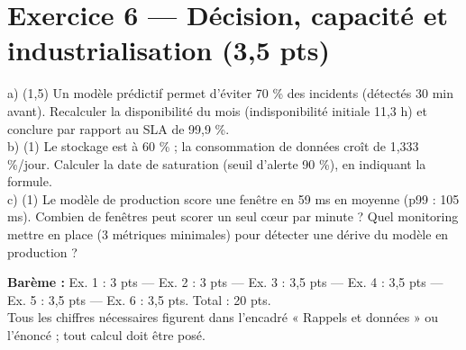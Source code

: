 \documentclass[11pt,a4paper]{article}
\begin{document}
\section*{Exercice 6 --- Décision, capacité et industrialisation (3,5 pts)}
a) (1,5) Un modèle prédictif permet d'éviter 70 \% des incidents (détectés 30 min avant).
Recalculer la disponibilité du mois (indisponibilité initiale 11,3 h) et conclure par
rapport au SLA de 99,9 \%.\\
b) (1) Le stockage est à 60 \% ; la consommation de données croît de 1,333 \%/jour.
Calculer la date de saturation (seuil d'alerte 90 \%), en indiquant la formule.\\
c) (1) Le modèle de production score une fenêtre en 59 ms en moyenne (p99 : 105 ms).
Combien de fenêtres peut scorer un seul cœur par minute ? Quel monitoring mettre en place
(3 métriques minimales) pour détecter une dérive du modèle en production ?

\vspace{2mm}
\begin{center}\small
\textbf{Barème :} Ex. 1 : 3 pts --- Ex. 2 : 3 pts --- Ex. 3 : 3,5 pts --- Ex. 4 : 3,5 pts ---
Ex. 5 : 3,5 pts --- Ex. 6 : 3,5 pts. \quad Total : 20 pts.\\
Tous les chiffres nécessaires figurent dans l'encadré « Rappels et données » ou l'énoncé ;
tout calcul doit être posé.
\end{center}
\end{document}
